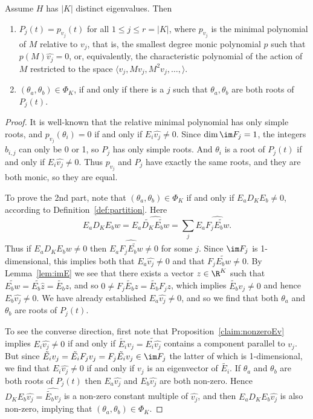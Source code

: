 \begin{lemma}\label{lem:K_distinct} Assume $H$ has $|K|$ distinct eigenvalues. Then
\begin{enumerate} 
\item
$P_j(t) = p_{v_j}(t)$ for all $1 \leq j \leq r = |K|$, where $p_{v_j}$ is the minimal polynomial of $M$ relative to $v_j$, that is, the smallest degree monic polynomial $p$ such that $p(M)\hat{v_j} = 0$, or, equivalently, the characteristic polynomial of the action of $M$ restricted to the space $\langle v_j, M v_j, M^2 v_j, \dots, \rangle$.  

\item $(\theta_a,\theta_b) \in \Phi_K$, if and only if there is a $j$ such that $\theta_a, \theta_b$ are both roots of $P_j(t)$. 
\end{enumerate}
\end{lemma}

\begin{proof} It is well-known that the relative minimal polynomial has only simple roots, and $p_{v_j}(\theta_i) = 0$ if and only if $E_i \hat{v_j} \neq 0$. Since $\dim\im F_j = 1$, the integers $b_{i,j}$ can only be 0 or 1, so $P_j$ has only simple roots. And $\theta_i$ is a root of $P_j(t)$ if and only if $E_i \hat{v_j} \neq 0$. Thus $p_{v_j}$ and $P_j$ have exactly the same roots, and they are both monic, so they are equal. 

To prove the 2nd part, note that $(\theta_a,\theta_b) \in \Phi_K$ if and only if $E_a D_K E_b \neq 0$, according to Definition~\ref{def:partition}. Here 
\[E_a D_K E_b w = E_a \widehat{\widetilde{D_K} \widetilde{E_b w}} = \sum_j E_a \widehat{F_j \widetilde{E_b w}}.\] Thus if $E_a D_K E_b w \neq 0$ then $E_a \widehat{F_j \widetilde{E_b w}} \neq 0$ for some $j$. Since $\im F_j$ is 1-dimensional, this implies both that $E_a \hat{v_j} \neq 0$ and that $F_j \widetilde{E_b w} \neq 0$. By Lemma~\ref{lem:imE} we see that there exists a vector $z \in \R^K$ such that $\widetilde{E_b w} = \widetilde{E_b  \hat{z}} = \tilde{E_b} z$, and so $0 \neq F_j \tilde{E_b} z= \tilde{E_b} F_j z$, which implies $\tilde{E_b} v_j \neq 0$ and hence $E_b \hat{v_j} \neq 0$. We have already established $E_a \hat{v_j} \neq 0$, and so we find that both $\theta_a$ and $\theta_b$ are roots of $P_j(t)$.

To see the converse direction, first note that
Proposition~\ref{claim:nonzeroEv} implies $E_i \hat{v_j} \neq 0$  if and only if $\tilde{E_i}v_j = \widetilde{E_i \hat{v_j}}$ contains a component parallel to $v_j$. But since $\tilde{E_i} v_j = \tilde{E_i} F_j v_j = F_j \tilde{E_i}v_j \in \im F_j$ the latter of which is 1-dimensional, we find that $E_i \hat{v_j} \neq 0$ if and only if $v_j$ is an eigenvector of $\widetilde{E_i}$. If $\theta_a$ and $\theta_b$ are both roots of $P_j(t)$ then $E_a \hat{v_j}$ and $E_b \hat{v_j}$ are both non-zero. Hence $D_K E_b \hat{v_j} = \widehat{ \tilde{E_b} v_j}$ is a non-zero constant multiple of $\hat{v_j}$, and then $E_a D_K E_b \hat{v_j}$ is also non-zero, implying that $(\theta_a, \theta_b) \in \Phi_K$.
\end{proof}


